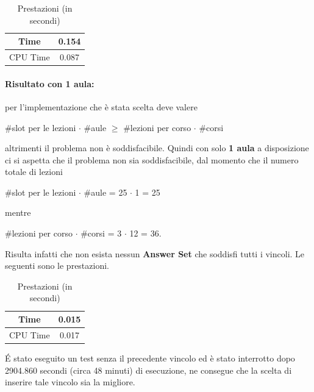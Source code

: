 \documentclass[a4paper,oneside,12pt]{book}
\begin{document}
	\FloatBarrier
	\begin{table}[htb]
		\centering
		\begin{tabular}{|c | c|}
			\hline
			Time &0.154\\
			\hline
			CPU Time &0.087\\
			\hline
		\end{tabular}
		\caption{Prestazioni (in secondi)}
	\end{table}\FloatBarrier
	\paragraph{Risultato con 1 aula:}

	per l'implementazione che è stata scelta deve valere\begin{center}

															\#slot per le lezioni $\cdot$ \#aule  $\ge$ \#lezioni per corso $\cdot$ \#corsi
	\end{center}
	altrimenti il problema non è soddisfacibile. Quindi con solo \textbf{1 aula} a disposizione ci si aspetta che il problema non sia soddisfacibile, dal momento che il numero totale di lezioni
	\begin{center}

		\#slot per le lezioni $\cdot$ \#aule  = 25 $\cdot$ 1 = 25\\
	\end{center}
	mentre
	\begin{center}
		\#lezioni per corso $\cdot$ \#corsi  = 3 $\cdot$ 12 = 36.\\
	\end{center}
	Risulta infatti che non esista nessun \textbf{Answer Set} che soddisfi tutti i vincoli. Le seguenti sono le prestazioni.
	\FloatBarrier
	\begin{table}[htb]
		\centering
		\begin{tabular}{|c | c|}
			\hline
			Time &0.015\\
			\hline
			CPU Time &0.017\\
			\hline
		\end{tabular}
		\caption{Prestazioni (in secondi)}
	\end{table}
	\FloatBarrier
	\noindent \'E stato eseguito un test senza il precedente vincolo ed è stato interrotto dopo 2904.860 secondi (circa 48 minuti) di esecuzione, ne consegue che la scelta di inserire tale vincolo sia la migliore.
\end{document}
